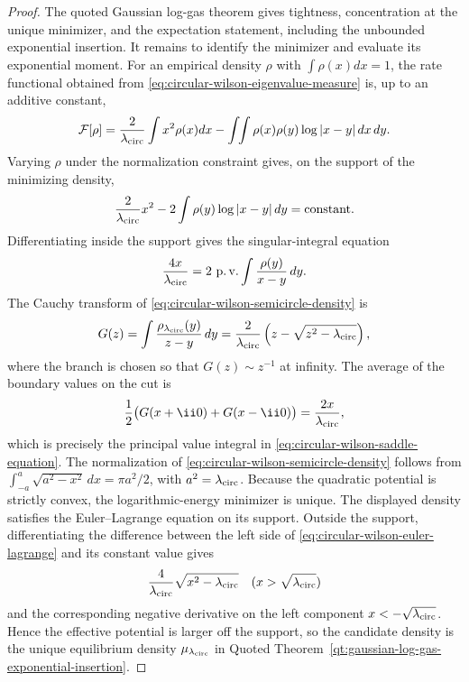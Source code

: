 \begin{proof}
The quoted Gaussian log-gas theorem gives tightness, concentration at the
unique minimizer, and the expectation statement, including the unbounded
exponential insertion.  It remains to identify the minimizer and evaluate its
exponential moment.  For an empirical density \(\rho\) with
\(\int\rho(x)dx=1\), the rate functional obtained from
\eqref{eq:circular-wilson-eigenvalue-measure} is, up to an additive constant,
\begin{equation}
  \mathcal F[\rho]
  =
  \frac{2}{\lambda_{\rm circ}}\int x^2\rho(x)dx
  -
  \int\!\!\int
  \rho(x)\rho(y)\log|x-y|\,dx\,dy .
  \label{eq:circular-wilson-density-functional}
\end{equation}
Varying \(\rho\) under the normalization constraint gives, on the support of
the minimizing density,
\begin{equation}
  \frac{2}{\lambda_{\rm circ}}x^2
  -
  2\int\rho(y)\log|x-y|\,dy
  =
  \text{constant}.
  \label{eq:circular-wilson-euler-lagrange}
\end{equation}
Differentiating inside the support gives the singular-integral equation
\begin{equation}
  \frac{4x}{\lambda_{\rm circ}}
  =
  2\,\operatorname{p.v.}
  \int\frac{\rho(y)}{x-y}\,dy .
  \label{eq:circular-wilson-saddle-equation}
\end{equation}
The Cauchy transform of
\eqref{eq:circular-wilson-semicircle-density} is
\begin{equation}
  G(z)
  =
  \int
  \frac{\rho_{\lambda_{\rm circ}}(y)}{z-y}\,dy
  =
  \frac{2}{\lambda_{\rm circ}}
  \left(z-\sqrt{z^2-\lambda_{\rm circ}}\right),
  \label{eq:circular-wilson-cauchy-transform}
\end{equation}
where the branch is chosen so that \(G(z)\sim z^{-1}\) at infinity.  The
average of the boundary values on the cut is
\[
  \frac12\bigl(G(x+\ii0)+G(x-\ii0)\bigr)
  =
  \frac{2x}{\lambda_{\rm circ}},
\]
which is precisely the principal value integral in
\eqref{eq:circular-wilson-saddle-equation}.  The normalization of
\eqref{eq:circular-wilson-semicircle-density} follows from
\(\int_{-a}^{a}\sqrt{a^2-x^2}\,dx=\pi a^2/2\), with
\(a^2=\lambda_{\rm circ}\).
Because the quadratic potential is strictly convex, the logarithmic-energy
minimizer is unique.  The displayed density satisfies the Euler--Lagrange
equation on its support.  Outside the support, differentiating the difference
between the left side of
\eqref{eq:circular-wilson-euler-lagrange} and its constant value gives
\[
  \frac{4}{\lambda_{\rm circ}}
  \sqrt{x^2-\lambda_{\rm circ}}
  \quad (x>\sqrt{\lambda_{\rm circ}})
\]
and the corresponding negative derivative on the left component
\(x<-\sqrt{\lambda_{\rm circ}}\).  Hence the effective potential is larger
off the support, so the candidate density is the unique equilibrium density
\(\mu_{\lambda_{\rm circ}}\) in
Quoted Theorem~\ref{qt:gaussian-log-gas-exponential-insertion}.


\end{proof}
